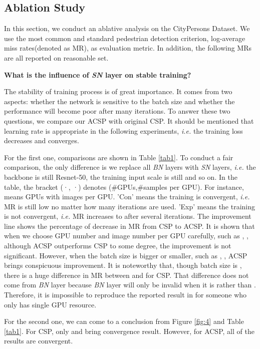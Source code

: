 \documentclass[twocolumn]{article}
\begin{document}
\subsection{Ablation Study}
In this section, we conduct an ablative analysis on the CityPersons Dataset\cite{zhang2017citypersons}. We use the most common and standard pedestrian detection criterion, log-average miss rates(denoted as MR), as evaluation metric. In addition, the following MRs are all reported on reasonable set. \par 
\textbf{What is the influence of \textit{SN} layer on stable training?}\par
The stability of training process is of great importance. It comes from two aspects: whether the network is sensitive to the batch size and whether the performance will become poor after many iterations. To answer these two questions, we compare our ACSP with original CSP\cite{liu2019high}. It should be mentioned that learning rate is  appropriate in the following experiments,  \textit{i.e.} the training loss decreases and converges.\par  
For the first one, comparisons are shown in Table \ref{tab1}. To conduct a fair comparison, the only difference is we replace all \textit{BN} layers with \textit{SN} layers, \textit{i.e.} the backbone is still Resnet-50, the training input scale is still   and so on. In the table, the bracket (·, ·) denotes (\#GPUs,\#samples per GPU). For instance,  means  GPUs with  images per GPU. 'Con' means the training is convergent, \textit{i.e.} MR is still low no matter how many iterations are used. 'Exp' means the training is not convergent, \textit{i.e.} MR increases to  after several iterations. The improvement line shows the percentage of decrease in MR from CSP\cite{liu2019high} to ACSP. It is shown that when we choose GPU number and image number per GPU carefully, such as , , although ACSP outperforms CSP\cite{liu2019high} to some degree, the improvement is not significant. However, when the batch size is bigger or smaller, such as  , , ACSP brings conspicuous improvement. It is noteworthy that, though batch size is , there is a huge difference in MR between  and  for CSP\cite{liu2019high}. That difference does not come from \textit{BN} layer because  \textit{BN} layer will only be invalid when it is  rather than . Therefore, it is impossible to reproduce the reported result in \cite{liu2019high} for someone who only has single GPU resource. \par 
For the second one, we can come to a conclusion from Figure \ref{fig:4} and Table \ref{tab1}. For CSP\cite{liu2019high}, only  and  bring convergence result. However, for ACSP, all of the results are convergent.
\end{document}
